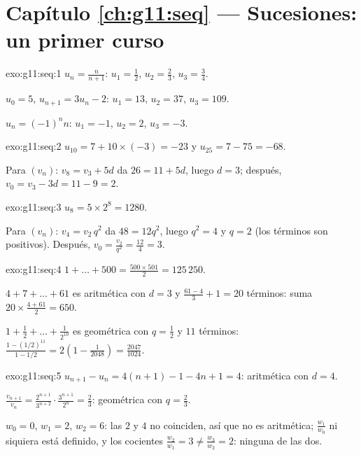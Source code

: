 \section*{Capítulo \ref{ch:g11:seq} --- Sucesiones: un primer curso}

\begin{solution}{exo:g11:seq:1}
$u_n = \frac{n}{n+1}$: $u_1 = \frac12$, $u_2 = \frac23$,
$u_3 = \frac34$.

$u_0 = 5$, $u_{n+1} = 3u_n - 2$: $u_1 = 13$, $u_2 = 37$, $u_3 = 109$.

$u_n = (-1)^n n$: $u_1 = -1$, $u_2 = 2$, $u_3 = -3$.
\end{solution}

\begin{solution}{exo:g11:seq:2}
$u_{10} = 7 + 10 \times (-3) = -23$ y $u_{25} = 7 - 75 = -68$.

Para $(v_n)$: $v_8 = v_3 + 5d$ da $26 = 11 + 5d$, luego $d = 3$; después,
$v_0 = v_3 - 3d = 11 - 9 = 2$.
\end{solution}

\begin{solution}{exo:g11:seq:3}
$u_8 = 5 \times 2^8 = 1280$.

Para $(v_n)$: $v_4 = v_2\, q^2$ da $48 = 12 q^2$, luego $q^2 = 4$ y
$q = 2$ (los términos son positivos). Después,
$v_0 = \frac{v_2}{q^2} = \frac{12}{4} = 3$.
\end{solution}

\begin{solution}{exo:g11:seq:4}
$1 + \dots + 500 = \frac{500 \times 501}{2} = 125\,250$.

$4 + 7 + \dots + 61$ es aritmética con $d = 3$ y
$\frac{61 - 4}{3} + 1 = 20$ términos: suma
$20 \times \frac{4 + 61}{2} = 650$.

$1 + \frac12 + \dots + \frac{1}{2^{10}}$ es geométrica con $q = \frac12$ y
$11$ términos:
$\frac{1 - (1/2)^{11}}{1 - 1/2} = 2\left(1 - \frac{1}{2048}\right)
= \frac{2047}{1024}$.
\end{solution}

\begin{solution}{exo:g11:seq:5}
$u_{n+1} - u_n = 4(n+1) - 1 - 4n + 1 = 4$: aritmética con $d = 4$.

$\frac{v_{n+1}}{v_n} = \frac{2^{n+1}}{3^{n+2}} \cdot \frac{3^{n+1}}{2^n}
= \frac23$: geométrica con $q = \frac23$.

$w_0 = 0$, $w_1 = 2$, $w_2 = 6$: las  $2$ y $4$ no coinciden,
así que no es aritmética; $\frac{w_1}{w_0}$ ni siquiera está definido, y
los cocientes $\frac{w_2}{w_1} = 3 \neq \frac{w_3}{w_2} = 2$: ninguna de
las dos.
\end{solution}


